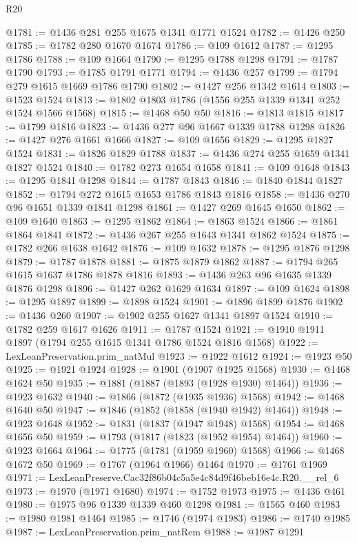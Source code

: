 \begin{lexlean}{R20}
\begin{coremodule}
@1781 := @1436 @281 @255 @1675 @1341 @1771 @1524
@1782 := @1426 @250
@1785 := @1782 @280 @1670 @1674
@1786 := @109 @1612
@1787 := @1295 @1786
@1788 := @109 @1664
@1790 := @1295 @1788 @1298
@1791 := @1787 @1790
@1793 := @1785 @1791 @1771
@1794 := @1436 @257
@1799 := @1794 @279 @1615 @1669 @1786 @1790
@1802 := @1427 @256 @1342 @1614
@1803 := @1523 @1524
@1813 := @1802 @1803 @1786 (@1556 @255 @1339 @1341 @252 @1524 @1566 @1568)
@1815 := @1468 @50 @50
@1816 := @1813 @1815
@1817 := @1799 @1816
@1823 := @1436 @277 @96 @1667 @1339 @1788 @1298
@1826 := @1427 @276 @1661 @1666
@1827 := @109 @1656
@1829 := @1295 @1827 @1524
@1831 := @1826 @1829 @1788
@1837 := @1436 @274 @255 @1659 @1341 @1827 @1524
@1840 := @1782 @273 @1654 @1658
@1841 := @109 @1648
@1843 := @1295 @1841 @1298
@1844 := @1787 @1843
@1846 := @1840 @1844 @1827
@1852 := @1794 @272 @1615 @1653 @1786 @1843 @1816
@1858 := @1436 @270 @96 @1651 @1339 @1841 @1298
@1861 := @1427 @269 @1645 @1650
@1862 := @109 @1640
@1863 := @1295 @1862
@1864 := @1863 @1524
@1866 := @1861 @1864 @1841
@1872 := @1436 @267 @255 @1643 @1341 @1862 @1524
@1875 := @1782 @266 @1638 @1642
@1876 := @109 @1632
@1878 := @1295 @1876 @1298
@1879 := @1787 @1878
@1881 := @1875 @1879 @1862
@1887 := @1794 @265 @1615 @1637 @1786 @1878 @1816
@1893 := @1436 @263 @96 @1635 @1339 @1876 @1298
@1896 := @1427 @262 @1629 @1634
@1897 := @109 @1624
@1898 := @1295 @1897
@1899 := @1898 @1524
@1901 := @1896 @1899 @1876
@1902 := @1436 @260
@1907 := @1902 @255 @1627 @1341 @1897 @1524
@1910 := @1782 @259 @1617 @1626
@1911 := @1787 @1524
@1921 := @1910 @1911 @1897 (@1794 @255 @1615 @1341 @1786 @1524 @1816 @1568)
@1922 := LexLeanPreservation.prim_natMul
@1923 := @1922 @1612
@1924 := @1923 @50
@1925 := @1921 @1924
@1928 := @1901 (@1907 @1925 @1568)
@1930 := @1468 @1624 @50
@1935 := @1881 (@1887 (@1893 (@1928 @1930) @1464))
@1936 := @1923 @1632
@1940 := @1866 (@1872 (@1935 @1936) @1568)
@1942 := @1468 @1640 @50
@1947 := @1846 (@1852 (@1858 (@1940 @1942) @1464))
@1948 := @1923 @1648
@1952 := @1831 (@1837 (@1947 @1948) @1568)
@1954 := @1468 @1656 @50
@1959 := @1793 (@1817 (@1823 (@1952 @1954) @1464))
@1960 := @1923 @1664
@1964 := @1775 (@1781 (@1959 @1960) @1568)
@1966 := @1468 @1672 @50
@1969 := @1767 (@1964 @1966) @1464
@1970 := @1761 @1969
@1971 := LexLeanPreserve.Cac32f86b04c5a5e4c84d9f46beb16e4c.R20.__rel_6
@1973 := @1970 (@1971 @1680)
@1974 := @1752 @1973
@1975 := @1436 @461
@1980 := @1975 @96 @1339 @1339 @460 @1298
@1981 := @1565 @460
@1983 := @1980 @1981 @1464
@1985 := @1746 (@1974 @1983)
@1986 := @1740 @1985
@1987 := LexLeanPreservation.prim_natRem
@1988 := @1987 @1291

\end{coremodule}
\end{lexlean}
